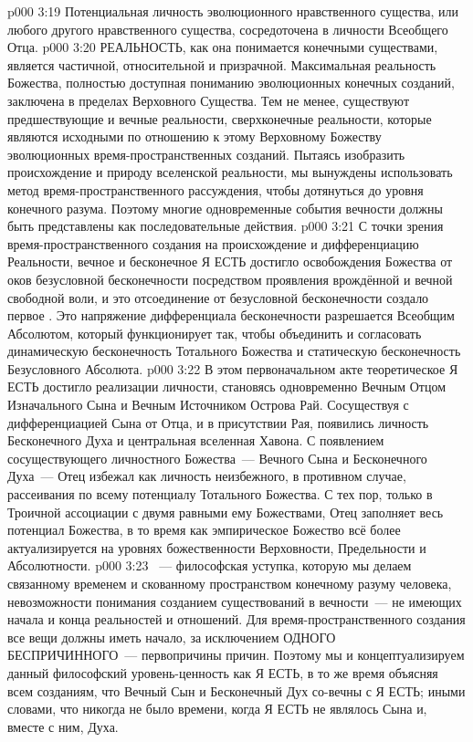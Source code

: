\vs p000 3:19 Потенциальная личность эволюционного нравственного существа, или любого другого нравственного существа, сосредоточена в личности Всеобщего Отца.
\vs p000 3:20 \pc РЕАЛЬНОСТЬ, как она понимается конечными существами, является частичной, относительной и призрачной. Максимальная реальность Божества, полностью доступная пониманию эволюционных конечных созданий, заключена в пределах Верховного Существа. Тем не менее, существуют предшествующие и вечные реальности, сверхконечные реальности, которые являются исходными по отношению к этому Верховному Божеству эволюционных время\hyp{}пространственных созданий. Пытаясь изобразить происхождение и природу вселенской реальности, мы вынуждены использовать метод время\hyp{}пространственного рассуждения, чтобы дотянуться до уровня конечного разума. Поэтому многие одновременные события вечности должны быть представлены как последовательные действия.
\vs p000 3:21 С точки зрения время\hyp{}пространственного создания на происхождение и дифференциацию Реальности, вечное и бесконечное Я ЕСТЬ достигло освобождения Божества от оков безусловной бесконечности посредством проявления врождённой и вечной свободной воли, и это отсоединение от безусловной бесконечности создало первое . Это напряжение дифференциала бесконечности разрешается Всеобщим Абсолютом, который функционирует так, чтобы объединить и согласовать динамическую бесконечность Тотального Божества и статическую бесконечность Безусловного Абсолюта.
\vs p000 3:22 В этом первоначальном акте теоретическое Я ЕСТЬ достигло реализации личности, становясь одновременно Вечным Отцом Изначального Сына и Вечным Источником Острова Рай. Сосуществуя с дифференциацией Сына от Отца, и в присутствии Рая, появились личность Бесконечного Духа и центральная вселенная Хавона. С появлением сосуществующего личностного Божества~--- Вечного Сына и Бесконечного Духа~--- Отец избежал как личность неизбежного, в противном случае, рассеивания по всему потенциалу Тотального Божества. С тех пор, только в Троичной ассоциации с двумя равными ему Божествами, Отец заполняет весь потенциал Божества, в то время как эмпирическое Божество всё более актуализируется на уровнях божественности Верховности, Предельности и Абсолютности.
\vs p000 3:23 \pc {}~--- философская уступка, которую мы делаем связанному временем и скованному пространством конечному разуму человека, невозможности понимания созданием существований в вечности~--- не имеющих начала и конца реальностей и отношений. Для время\hyp{}пространственного создания все вещи должны иметь начало, за исключением ОДНОГО БЕСПРИЧИННОГО~--- первопричины причин. Поэтому мы и концептуализируем данный философский уровень\hyp{}ценность как Я ЕСТЬ, в то же время объясняя всем созданиям, что Вечный Сын и Бесконечный Дух со\hyp{}вечны с Я ЕСТЬ; иными словами, что никогда не было времени, когда Я ЕСТЬ не являлось  Сына и, вместе с ним, Духа.

